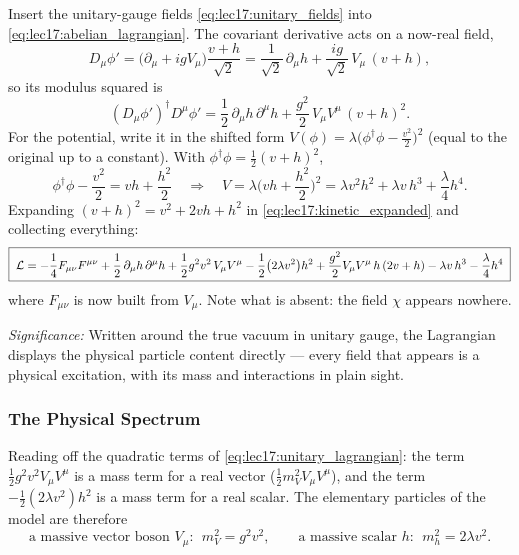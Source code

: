 Insert the unitary-gauge fields \eqref{eq:lec17:unitary_fields} into \eqref{eq:lec17:abelian_lagrangian}. The covariant derivative acts on a now-real field,
\begin{equation}
  D_\mu\phi'
  =\big(\partial_\mu+i g V_\mu\big)\frac{v+h}{\sqrt2}
  =\frac{1}{\sqrt2}\,\partial_\mu h+\frac{i g}{\sqrt2}\,V_\mu\,(v+h) ,
  \label{eq:lec17:Dmu_unitary}
\end{equation}
so its modulus squared is
\begin{equation}
  (D_\mu\phi')^\dagger D^\mu\phi'
  =\frac12\,\partial_\mu h\,\partial^\mu h
  +\frac{g^2}{2}\,V_\mu V^\mu\,(v+h)^2 .
  \label{eq:lec17:kinetic_expanded}
\end{equation}
For the potential, write it in the shifted form $V(\phi)=\lambda\big(\phi^\dagger\phi-\tfrac{v^2}{2}\big)^2$ (equal to the original up to a constant). With $\phi^\dagger\phi=\tfrac12(v+h)^2$,
\begin{equation}
  \phi^\dagger\phi-\frac{v^2}{2}=v h+\frac{h^2}{2}
  \quad\Longrightarrow\quad
  V=\lambda\Big(v h+\frac{h^2}{2}\Big)^2
  =\lambda v^2 h^2+\lambda v\,h^3+\frac{\lambda}{4}h^4 .
  \label{eq:lec17:potential_expanded}
\end{equation}
Expanding $(v+h)^2=v^2+2vh+h^2$ in \eqref{eq:lec17:kinetic_expanded} and collecting everything:
\begin{equation}
  \boxed{\;
  \mathcal{L}=-\frac14 F_{\mu\nu}F^{\mu\nu}
  +\frac12\,\partial_\mu h\,\partial^\mu h
  +\frac12 g^2v^2\,V_\mu V^\mu
  -\frac12\big(2\lambda v^2\big)h^2
  +\frac{g^2}{2}V_\mu V^\mu\,h\,(2v+h)
  -\lambda v\,h^3-\frac{\lambda}{4}h^4
  \;}
  \label{eq:lec17:unitary_lagrangian}
\end{equation}
where $F_{\mu\nu}$ is now built from $V_\mu$. Note what is absent: the field $\chi$ appears nowhere.

\textit{Significance:} Written around the true vacuum in unitary gauge, the Lagrangian displays the physical particle content directly --- every field that appears is a physical excitation, with its mass and interactions in plain sight.

\subsubsection*{The Physical Spectrum}

Reading off the quadratic terms of \eqref{eq:lec17:unitary_lagrangian}: the term $\tfrac12 g^2v^2V_\mu V^\mu$ is a mass term for a real vector ($\tfrac12 m_V^2 V_\mu V^\mu$), and the term $-\tfrac12(2\lambda v^2)h^2$ is a mass term for a real scalar. The elementary particles of the model are therefore
\begin{equation}
  \boxed{\;
  \text{a massive vector boson } V_\mu:\ \ m_V^2=g^2v^2 ,
  \qquad
  \text{a massive scalar } h:\ \ m_h^2=2\lambda v^2 .
  \;}
  \label{eq:lec17:spectrum}
\end{equation}

